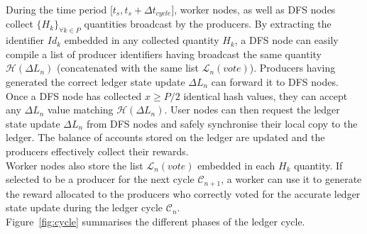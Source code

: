 During the time period [$t_{s}, t_s + \Delta t_{cycle}$], worker nodes, as well as DFS nodes collect $\{H_k\}_{\forall k \in P}$ quantities broadcast by the producers. 
By extracting the identifier $Id_k$ embedded in any collected quantity $H_k$, a DFS node can easily compile a list of producer identifiers having broadcast the same quantity $\mathcal{H}(\Delta L_n)$ (concatenated with the same list $\mathcal{L}_{n}(vote)$). Producers having generated the correct ledger state update $\Delta L_n$ can forward it to DFS nodes. Once a DFS node has collected $x \geq P/2$ identical hash values, they can accept any $\Delta L_n$ value matching $\mathcal{H}(\Delta L_n)$. User nodes can then request the ledger state update $\Delta L_n$ from DFS nodes and safely synchronise their local copy to the ledger. The balance of accounts stored on the ledger are updated and the producers effectively collect their rewards. \\

Worker nodes also store the list $\mathcal{L}_{n}(vote)$ embedded in each $H_k$ quantity. If selected to be a producer for the next cycle $\mathcal{C}_{n+1}$, a worker can use it to generate the reward allocated to the producers who correctly voted for the accurate ledger state update during the ledger cycle $\mathcal{C}_{n}$.\\

Figure~\ref{fig:cycle} summarises the different phases of the ledger cycle.\\


